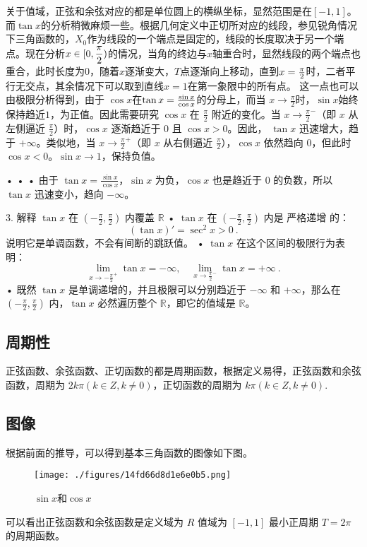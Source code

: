 关于值域，正弦和余弦对应的都是单位圆上的横纵坐标，显然范围是在$[-1,1]$。而$\tan x$的分析稍微麻烦一些。根据几何定义中正切所对应的线段，参见锐角情况下三角函数的，$X_0$作为线段的一个端点是固定的，线段的长度取决于另一个端点。现在分析$\displaystyle x\in[0,{\pi\over2})$的情况，当角的终边与$x$轴重合时，显然线段的两个端点也重合，此时长度为$0$，随着$x$逐渐变大，$T$点逐渐向上移动，直到$x={\pi\over2}$时，二者平行无交点，其余情况下可以取到直线$x=1$在第一象限中的所有点。
这一点也可以由极限分析得到，由于 $\cos x$在$\tan x={\sin x\over\cos x}$的分母上，而当 $x \to \frac{\pi}{2}$时，$\sin x $始终保持趋近$1$，为正值。因此需要研究 $\cos x$ 在 $\frac{\pi}{2}$ 附近的变化。当 $x \to \frac{\pi}{2}^-$（即 $x$ 从左侧逼近 $\frac{\pi}{2}$）时，$\cos x$ 逐渐趋近于 $0$ 且 $\cos x > 0$。因此， $\tan x$ 迅速增大，趋于 $+\infty$。类似地，当 $x \to \frac{\pi}{2}^+$（即 $x$ 从右侧逼近 $\frac{\pi}{2}$），$\cos x$ 依然趋向 $0$，但此时 $\cos x < 0$。$\sin x \to 1$，保持负值。



	•	
	•	
	•	由于 $\tan x = \frac{\sin x}{\cos x}$，$\sin x$ 为负，$\cos x$ 也是趋近于 $0$ 的负数，所以 $\tan x$ 迅速变小，趋向 $-\infty$。

3. 解释 $\tan x$ 在 $(-\frac{\pi}{2}, \frac{\pi}{2})$ 内覆盖 $\mathbb{R}$
	•	$\tan x$ 在 $(-\frac{\pi}{2}, \frac{\pi}{2})$ 内是 严格递增 的：
$$
(\tan x)' = \sec^2 x > 0~.
$$
说明它是单调函数，不会有间断的跳跃值。
	•	$\tan x$ 在这个区间的极限行为表明：
$$
\lim\limits_{x \to -\frac{\pi}{2}^+} \tan x = -\infty, \quad \lim\limits_{x \to \frac{\pi}{2}^-} \tan x = +\infty~.
$$
	•	既然 $\tan x$ 是单调递增的，并且极限可以分别趋近于 $-\infty$ 和 $+\infty$，那么在 $(-\frac{\pi}{2}, \frac{\pi}{2})$ 内，$\tan x$ 必然遍历整个 $\mathbb{R}$，即它的值域是 $\mathbb{R}$。

\subsection{周期性}

正弦函数、余弦函数、正切函数的都是周期函数，根据定义易得，正弦函数和余弦函数，周期为 $2k\pi(k\in Z,k\neq0)$，正切函数的周期为 $k\pi(k\in Z,k\neq0)$.


\subsection{图像}
根据前面的推导，可以得到基本三角函数的图像如下图。
\begin{figure}[ht]
\centering
\texttt{[image: ./figures/14fd66d8d1e6e0b5.png]}
\caption{$\sin x$和$\cos x$} \label{fig_HsTFFv_1}
\end{figure}
可以看出正弦函数和余弦函数是定义域为 $R$ 值域为 $[-1,1]$ 最小正周期 $T = 2\pi$ 的周期函数。

